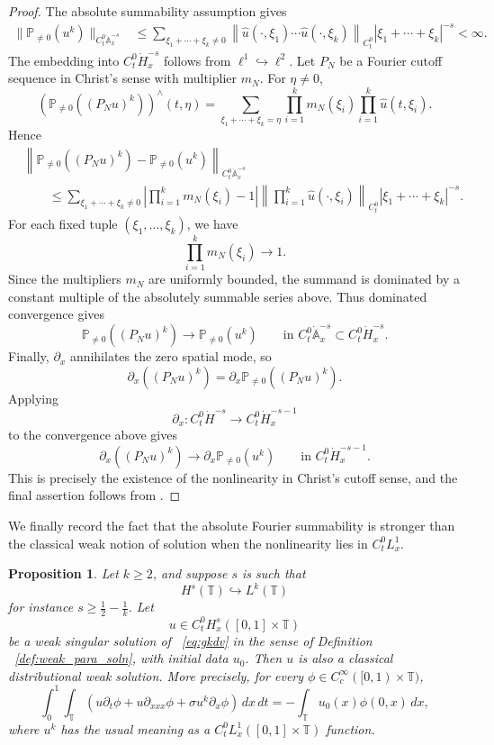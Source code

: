 \documentclass[12pt,reqno,letterpaper]{amsart}
\numberwithin{equation}{section}
\newcommand{\1}{{\bf 1}}
\newcommand{\2}{{\bf 2}}
\newcommand{\A}{\mathbb A}
\newcommand{\T}{\mathbb T}
\newtheorem{proposition}[theorem]{Proposition}
\theoremstyle{remark}
\theoremstyle{remark}
\begin{document}
\begin{proof}
    The absolute summability assumption gives
    \[
    \begin{aligned}
        \|\mathbb P_{\neq0}(u^k)\|_{C_t^0\dot{\A}_x^{-s}} &\le \sum_{\xi_1+\cdots+\xi_k\neq0}\left\|\hat u(\cdot,\xi_1)\cdots \hat u(\cdot,\xi_k)\right\|_{C_t^0}|\xi_1+\cdots+\xi_k|^{-s} <\infty.
    \end{aligned}
    \]
    The embedding into $C_t^0\dot H^{-s}_x$ follows from $\ell^1\hookrightarrow \ell^2$.
    Let $P_N$ be a Fourier cutoff sequence in Christ's sense with multiplier $m_N$. For $\eta\neq0$,
    \[
    \left(\mathbb P_{\neq0}((P_Nu)^k)\right)^{\wedge}(t,\eta) = \sum_{\xi_1+\cdots+\xi_k=\eta} \prod_{i=1}^k m_N(\xi_i) \prod_{i=1}^k \hat u(t,\xi_i).
    \]
    Hence
    \[
    \begin{aligned}
        &\left\| \mathbb P_{\neq0}((P_Nu)^k) -\mathbb P_{\neq0}(u^k)\right\|_{C_t^0\dot{\A}_x^{-s}} \\
        &\qquad\le \sum_{\xi_1+\cdots+\xi_k\neq0}\left|\prod_{i=1}^k m_N(\xi_i)-1\right|\left\|\prod_{i=1}^k \hat u(\cdot,\xi_i)\right\|_{C_t^0}|\xi_1+\cdots+\xi_k|^{-s}.
    \end{aligned}
    \]
    For each fixed tuple $(\xi_1,\ldots,\xi_k)$, we have 
    \[
    \prod_{i=1}^k m_N(\xi_i)\to1.
    \]
    Since the multipliers $m_N$ are uniformly bounded, the summand is dominated by a constant multiple of the absolutely summable series above. Thus dominated convergence gives
    \[
    \mathbb P_{\neq0}((P_Nu)^k) \to \mathbb P_{\neq0}(u^k)
    \qquad \text{in }C_t^0\dot{\mathbb A}^{-s}_x\subset C_t^0\dot H^{-s}_x.
    \]
    Finally, $\partial_x$ annihilates the zero spatial mode, so
    \[
    \partial_x((P_Nu)^k) = \partial_x\mathbb P_{\neq0}((P_Nu)^k).
    \]
    Applying
    \[
    \partial_x:C_t^0\dot H^{-s}\to C_t^0\dot H_x^{-s-1}
    \]
    to the convergence above gives
    \[
    \partial_x((P_Nu)^k)\to \partial_x\mathbb P_{\neq0}(u^k)
    \qquad \text{in }C_t^0\dot H_x^{-s-1}.
    \]
    This is precisely the existence of the nonlinearity in Christ's cutoff sense, and the final assertion follows from \cite[Definition~2.3]{Christ1}.
\end{proof}

We finally record the fact that the absolute Fourier summability is stronger than the classical weak notion of solution when the nonlinearity lies in $C_t^0L_x^1$.

\begin{proposition}\label{prop:singular-implies-classical}
    Let $k \ge 2$, and suppose $s$ is such that
    \[
    H^s(\T) \hookrightarrow L^k(\T)
    \]
    for instance $s \ge \frac12-\frac1k$. Let 
    \[
    u \in C_t^0 H^s_x([0,1] \times \T)
    \]
    be a weak singular solution of ~\eqref{eq:gkdv} in the sense of Definition ~\ref{def:weak_para_soln}, with initial data $u_0$. Then $u$ is also a classical distributional weak solution. More precisely, for every $\phi \in C_c^\infty([0,1)\times \T)$,
    \[
    \int_0^1\int_\T \left( u\partial_t\phi+u\partial_{xxx}\phi+\sigma u^k\partial_x\phi\right) \,dx\,dt = -\int_\T u_0(x)\phi(0,x)\,dx,
    \]
    where $u^k$ has the usual meaning as a $C_t^0 L_x^1([0,1] \times \T)$ function.
\end{proposition}
\end{document}
